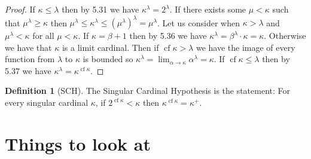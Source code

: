 \documentclass{article}
\theoremstyle{definition}
\newtheorem{defn}[thm]{Definition}
\DeclareMathOperator{\cf}{cf}
\begin{document}
\begin{proof}
    If $\kappa \le \lambda$ then by 5.31 we have $\kappa^\lambda = 2^\lambda$. If there exists some $\mu < \kappa$ such that $\mu^\lambda \ge \kappa$ then $\mu^\lambda \le \kappa^\lambda \le (\mu^{\lambda})^\lambda = \mu^{\lambda}$. Let us consider when $\kappa > \lambda$ and $\mu^\lambda < \kappa$ for all $\mu < \kappa$. If $\kappa = \beta + 1$ then by 5.36 we have $\kappa^{\lambda} = \beta^\lambda \cdot \kappa = \kappa$. Otherwise we have that $\kappa$ is a limit cardinal. Then if $\cf \kappa > \lambda$ we have the image of every function from $\lambda$ to $\kappa$ is bounded so $\kappa^\lambda = \lim_{\alpha \to \kappa} \alpha^\lambda = \kappa$. If $\cf \kappa \le \lambda$ then by 5.37 we have $\kappa^\lambda = \kappa^{\cf \kappa}$.
\end{proof}

\begin{defn}[SCH]
    The Singular Cardinal Hypothesis is the statement: For every singular cardinal $\kappa$, if $2^{\cf \kappa} < \kappa$ then $\kappa^{\cf \kappa} = \kappa^+$.
\end{defn}

\newpage

\section{Things to look at}
\end{document}
